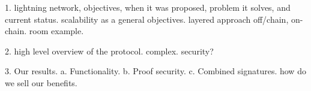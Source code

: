 
1. lightning network, objectives, when it was proposed, problem it solves, and current status. scalability as a general objectives. layered approach off/chain, on-chain. room example. 

2. high level overview of the protocol. complex. security? 

3. Our results. 
a. Functionality. 
b. Proof security. 
c. Combined signatures. 
how do we sell our benefits. 